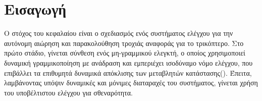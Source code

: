 \section{Εισαγωγή}

Ο στόχος του κεφαλαίου είναι ο σχεδιασμός ενός συστήματος ελέγχου για την 
αυτόνομη αιώρηση και παρακολούθηση τροχιάς αναφοράς για το τρικόπτερο. Στο πρώτο
στάδιο, γίνεται σύνθεση ενός μη-γραμμικού ελεγκτή, ο οποίος χρησιμοποιεί 
δυναμική γραμμικοποίηση με ανάδραση και εμπεριέχει ισοδύναμο νόμο ελέγχου, που 
επιβάλλει τα επιθυμητά δυναμικά απόκλισης των μεταβλητών κατάστασης(). Έπειτα, λαμβάνοντας υπόψιν δυναμικές και μόνιμες διαταραχές του 
συστήματος, γίνεται χρήση του υποβέλτιστου ελέγχου  για 
σθεναρότητα.


